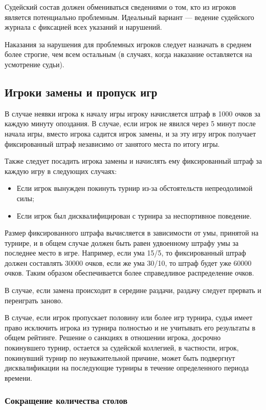 Судейский состав должен обмениваться сведениями о том, кто из игроков является потенциально проблемным. Идеальный вариант --- ведение судейского журнала с фиксацией всех указаний и нарушений.

Наказания за нарушения для проблемных игроков следует назначать в среднем более строгие, чем всем остальным (в случаях, когда наказание оставляется на усмотрение судьи).

\subsection{Игроки замены и пропуск игр}

В случае неявки игрока к началу игры игроку начисляется штраф в 1000 очков за каждую минуту опоздания. В случае, если игрок не явился через 5 минут после начала игры, вместо игрока садится игрок замены, и за эту игру игрок получает фиксированный штраф независимо от занятого места по итогу игры.

Также следует посадить игрока замены и начислять ему фиксированный штраф за каждую игру в следующих случаях:
\begin{itemize}
	\item Если игрок вынужден покинуть турнир из-за обстоятельств непреодолимой силы;
	\item Если игрок был дисквалифицирован с турнира за неспортивное поведение.
\end{itemize}

Размер фиксированного штрафа вычисляется в зависимости от умы, принятой на турнире, и в общем случае должен быть равен удвоенному штрафу умы за последнее место в игре. Например, если ума 15/5, то фиксированный штраф должен составлять 30000 очков, если же ума 30/10, то штраф будет уже 60000 очков. Таким образом обеспечивается более справедливое распределение очков.

В случае, если замена происходит в середине раздачи, раздачу следует прервать и переиграть заново.

В случае, если игрок пропускает половину или более игр турнира, судья имеет право исключить игрока из турнира полностью и не учитывать его результаты в общем рейтинге. Решение о санкциях в отношении игрока, досрочно покинувшего турнир, остается за судейской коллегией, в частности, игрок, покинувший турнир по неуважительной причине, может быть подвергнут дисквалификации на последующие турниры в течение определенного периода времени.

\subsubsection{Сокращение количества столов}

